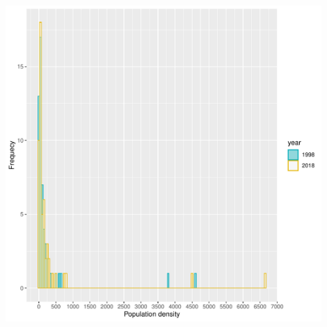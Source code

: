 \documentclass[12pt, oneside]{report}\usepackage[]{graphicx}\usepackage[]{color}
\begin{document}
\begin{Schunk}


{\centering \includegraphics[width=16cm,height=12cm]{figure/unnamed-chunk-20-1} 

}

\end{Schunk}
\end{document}
